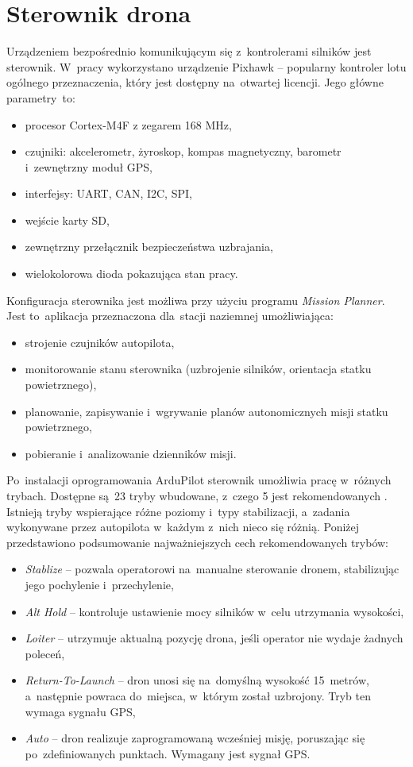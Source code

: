 \section{Sterownik drona}
\label{sec:autopilot}
Urządzeniem bezpośrednio komunikującym się z~kontrolerami silników jest sterownik. 
W~pracy wykorzystano urządzenie Pixhawk -- popularny kontroler lotu ogólnego przeznaczenia, który jest dostępny na~otwartej licencji. %
Jego główne parametry~to:
\begin{itemize}
	\item procesor Cortex-M4F z zegarem 168 MHz,
	\item czujniki: akcelerometr, żyroskop, kompas magnetyczny, barometr i~zewnętrzny moduł GPS,
	\item interfejsy: UART, CAN, I2C, SPI,
	\item wejście karty SD,
	\item zewnętrzny przełącznik bezpieczeństwa uzbrajania,
	\item wielokolorowa dioda pokazująca stan pracy.
\end{itemize}
Konfiguracja sterownika jest możliwa przy użyciu programu \textit{Mission Planner}. 
Jest to~aplikacja przeznaczona dla~stacji naziemnej umożliwiająca:
\begin{itemize}
	\item strojenie czujników autopilota,
	\item monitorowanie stanu sterownika (uzbrojenie silników, orientacja statku powietrznego),
	\item planowanie, zapisywanie i~wgrywanie planów autonomicznych misji statku powietrznego,
	\item pobieranie i~analizowanie dzienników misji.
\end{itemize} 

Po~instalacji oprogramowania ArduPilot sterownik umożliwia pracę w~różnych trybach. 
Dostępne są~23 tryby wbudowane, z~czego 5 jest rekomendowanych \cite{pixhawk_modes}. 
Istnieją tryby wspierające różne poziomy i~typy stabilizacji, a~zadania wykonywane przez autopilota w~każdym z~nich nieco się różnią. 
Poniżej przedstawiono podsumowanie najważniejszych cech rekomendowanych trybów:
\begin{itemize}
	\item \textit{Stablize} -- pozwala operatorowi na~manualne sterowanie dronem, stabilizując jego pochylenie i~przechylenie,
	\item \textit{Alt Hold} -- kontroluje ustawienie mocy silników w~celu utrzymania wysokości,
	\item \textit{Loiter} --  utrzymuje aktualną pozycję drona, jeśli operator nie wydaje żadnych poleceń,
	\item \textit{Return-To-Launch} --  dron unosi się na~domyślną wysokość 15~metrów, a~następnie powraca do~miejsca, w~którym został uzbrojony. Tryb ten wymaga sygnału GPS,
	\item \textit{Auto} --  dron realizuje zaprogramowaną wcześniej misję, poruszając się po~zdefiniowanych punktach. Wymagany jest sygnał GPS.
\end{itemize}

